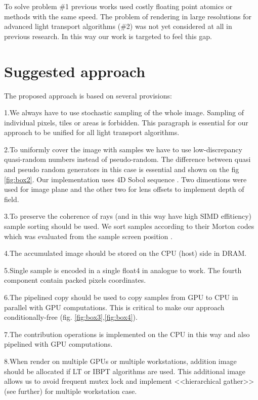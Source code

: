 \documentclass[twoside,twocolumn,10pt]{article}
\begin{document}
To solve problem \#1 previous works used costly floating point atomics or methods with the same speed. The problem of rendering in large resolutions for advanced light transport algorithms (\#2) was not yet considered at all in previous research. In this way our work is targeted to feel this gap.

\newpage
\section{Suggested approach}

The proposed approach is based on several provisions:

1.We always have to use stochastic sampling of the whole image. Sampling of individual pixels, tiles or areas is forbidden. This paragraph is essential for our approach to be unified for all light transport algorithms.

2.To uniformly cover the image with samples we have to use low-discrepancy quasi-random numbers instead of pseudo-random. The difference between quasi and pseudo random generators in this case is essential and shown on the fig \ref{fig:box2}. Our implementation uses 4D Sobol sequence \cite{Sobol67}. Two dimentions were used for image plane and the other two for lens offsets to implement depth of field.

3.To preserve the coherence of rays (and in this way have high SIMD effitiency) sample sorting should be used. We sort samples according to their Morton codes which was evaluated from the sample screen position \cite{Morton66}.

4.The accumulated image should be stored on the CPU (host) side in DRAM.

5.Single sample is encoded in a single float4 in analogue to \cite{MMLTGPU} work. The fourth component contain packed pixels coordinates.

6.The pipelined copy should be used to copy samples from GPU to CPU in parallel with GPU computations. This is critical to make our approach conditionally-free (fig. \ref{fig:box3},\ref{fig:box4}).

7.The contribution operations is implemented on the CPU in this way and also pipelined with GPU computations. 

8.When render on multiple GPUs or multiple workstations, addition image should be allocated if LT or IBPT algorithms are used. This additional image allows us to avoid frequent mutex lock and implement <<hierarchical gather>> (see further) for multiple workstation case.
\end{document}
